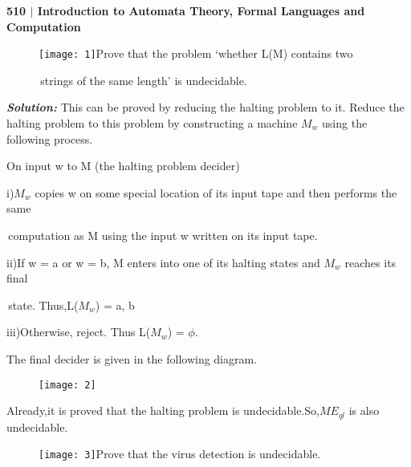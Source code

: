 \documentclass[10pt,a4paper]{book}
\begin{document}
\footnotesize

\begin{flushleft}
  \textsf{\textbf{510 $|$ Introduction to Automata Theory, Formal Languages and Computation}}
\end{flushleft}

\begin{flushleft}
\begin{figure}[h]
  \texttt{[image: 1]}\quad Prove that the problem ‘whether L(M) contains two
   
  \qquad\quad\qquad\qquad\qquad\qquad\,strings of the same length’ is undecidable.
\end{figure}
\end{flushleft}

\textbf{\textit{\!\!\!\!\!\!\!\!\!\!Solution:}} This can be proved by reducing the halting problem to it. Reduce the halting problem to this problem by constructing a machine $M_{w}$ using the following process.

On input w to M (the halting problem decider)

\quad

i)\;$M_{w}$ copies w on some special location of its input tape and then performs the same

\quad\,computation as M using the input w written on its input tape.

ii)\;If w = a or w = b, M enters into one of its halting states and $M_{w}$ reaches its final
 
\quad\,state. Thus,L($M_{w}$) = {a, b}

iii)\;Otherwise, reject. Thus L($M_{w}$) = ${\phi}$.

The final decider is given in the following diagram.

\begin{figure}[h]
  \centering
  \texttt{[image: 2]}\\
\end{figure}

\!\!\!Already,it is proved that the halting problem is undecidable.So,$ME_{ql}$ is also undecidable.

\begin{flushleft}
\begin{figure}[h]
  \texttt{[image: 3]}\quad Prove that the virus detection is undecidable.
\end{figure}
\end{flushleft}
\end{document}
